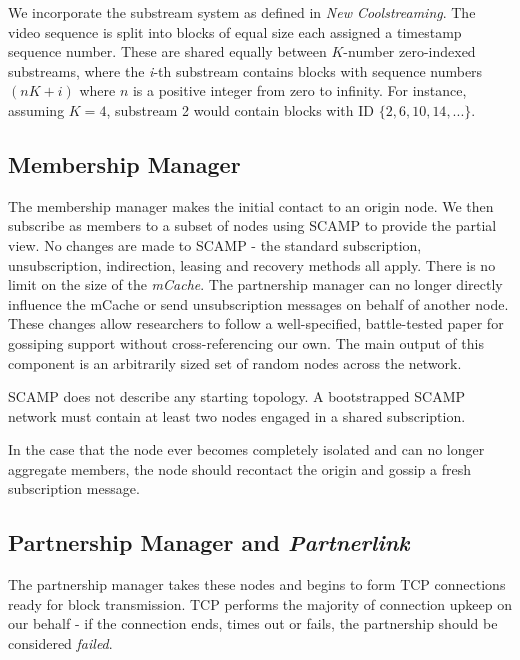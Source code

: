 \documentclass[12pt,a4paper]{article}
\begin{document}
We incorporate the substream system as defined in \textit{New Coolstreaming}. The video sequence is split into blocks of equal size each assigned a timestamp sequence number. These are shared equally between \(K\)-number zero-indexed substreams, where the \textit{i}-th substream contains blocks with sequence numbers \((nK + \textit{i})\) where \(n\) is a positive integer from zero to infinity. For instance, assuming \(K = 4\), substream 2 would contain blocks with ID \(\{2, 6, 10, 14, ...\}\).

\subsection{Membership Manager} \label{css:membership}
The membership manager makes the initial contact to an origin node. We then subscribe as members to a subset of nodes using SCAMP to provide the partial view. No changes are made to SCAMP - the standard subscription, unsubscription, indirection, leasing and recovery methods all apply. There is no limit on the size of the \textit{mCache}. The partnership manager can no longer directly influence the mCache or send unsubscription messages on behalf of another node. These changes allow researchers to follow a well-specified, battle-tested paper for gossiping support without cross-referencing our own. The main output of this component is an arbitrarily sized set of random nodes across the network.

SCAMP does not describe any starting topology. A bootstrapped SCAMP network must contain at least two nodes engaged in a shared subscription.

In the case that the node ever becomes completely isolated and can no longer aggregate members, the node should recontact the origin and gossip a fresh subscription message.

\subsection{Partnership Manager and \textit{Partnerlink}} \label{css:partnerlink}
The partnership manager takes these nodes and begins to form TCP connections ready for block transmission. TCP performs the majority of connection upkeep on our behalf - if the connection ends, times out or fails, the partnership should be considered \textit{failed}. 
\end{document}
